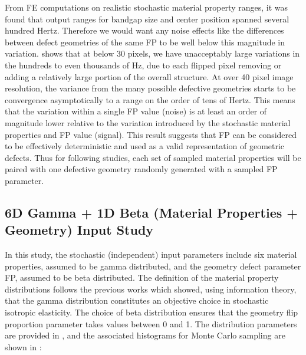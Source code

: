 \documentclass[preprint,review,12pt]{elsarticle}
\begin{document}
From FE computations on realistic stochastic material property ranges, it was found that output ranges for bandgap size and center position spanned several hundred Hertz. Therefore we would want any noise effects like the differences between defect geometries of the same FP to be well below this magnitude in variation.  shows that at below 30 pixels, we have unacceptably large variations in the hundreds to even thousands of Hz, due to each flipped pixel removing or adding a relatively large portion of the overall structure. At over 40 pixel image resolution, the variance from the many possible defective geometries starts to be convergence asymptotically to a range on the order of tens of Hertz. This means that the variation within a single FP value (noise) is at least an order of magnitude lower relative to the variation introduced by the stochastic material properties and FP value (signal). This result suggests that FP can be considered to be effectively deterministic and used as a valid representation of geometric defects. Thus for following studies, each set of sampled material properties will be paired with one defective geometry randomly generated with a sampled FP parameter.
\subsection{6D Gamma + 1D Beta (Material Properties + Geometry) Input Study}
\label{subsec:7D Gamma Input Space}

In this study, the stochastic (independent) input parameters include six material properties, assumed to be gamma distributed, and the geometry defect parameter FP, assumed to be beta distributed. The definition of the material property distributions follows the previous works \citep{Guilleminot_Soize_2013,Staber2017} which showed, using information theory, that the gamma distribution constitutes an objective choice in stochastic isotropic elasticity. The choice of beta distribution ensures that the geometry flip proportion parameter takes values between 0 and 1. The distribution parameters are provided in , and the associated histograms for Monte Carlo sampling are shown in : 
\end{document}
